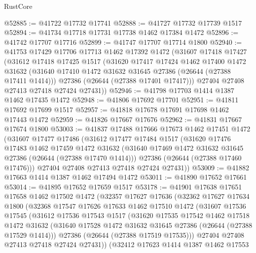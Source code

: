 \begin{lexlean}{RustCore}
\begin{coremodule}
@52885 := @41722 @17732 @17741
@52888 := @41727 @17732 @17739 @1517
@52894 := @41734 @17718 @17731 @17738 @1462 @17384 @1472
@52896 := @41742 @17707 @17716
@52899 := @41747 @17707 @17714 @1800
@52940 := @41753
    @17429
    @17706
    @17713
    @1462
    @17392
    @1472
    (@31607
      @17418
      @17427
      (@31612
        @17418
        @17425
        @1517
        (@31620
          @17417
          @17424
          @1462
          @17400
          @1472
          @31632
          (@31640 @17410 @1472 @31632 @31645 @27386 (@26644 (@27388 @17411 @1414)))
          @27386
          (@26644 (@27388 @17401 @17417)))
        @27404
        @27408
        @27413
        @27418
        @27424
        @27431))
@52946 := @41798 @17703 @1414 @1387 @1462 @17435 @1472
@52948 := @41806 @17692 @17701
@52951 := @41811 @17692 @17699 @1517
@52957 := @41818 @17678 @17691 @17698 @1462 @17443 @1472
@52959 := @41826 @17667 @17676
@52962 := @41831 @17667 @17674 @1800
@53003 := @41837
    @17488
    @17666
    @17673
    @1462
    @17451
    @1472
    (@31607
      @17477
      @17486
      (@31612
        @17477
        @17484
        @1517
        (@31620
          @17476
          @17483
          @1462
          @17459
          @1472
          @31632
          (@31640 @17469 @1472 @31632 @31645 @27386 (@26644 (@27388 @17470 @1414)))
          @27386
          (@26644 (@27388 @17460 @17476)))
        @27404
        @27408
        @27413
        @27418
        @27424
        @27431))
@53009 := @41882 @17663 @1414 @1387 @1462 @17494 @1472
@53011 := @41890 @17652 @17661
@53014 := @41895 @17652 @17659 @1517
@53178 := @41901
    @17638
    @17651
    @17658
    @1462
    @17502
    @1472
    (@32357
      @17627
      @17636
      (@32362
        @17627
        @17634
        @1800
        (@32368
          @17547
          @17626
          @17633
          @1462
          @17510
          @1472
          (@31607
            @17536
            @17545
            (@31612
              @17536
              @17543
              @1517
              (@31620
                @17535
                @17542
                @1462
                @17518
                @1472
                @31632
                (@31640 @17528 @1472 @31632 @31645 @27386 (@26644 (@27388 @17529 @1414)))
                @27386
                (@26644 (@27388 @17519 @17535)))
              @27404
              @27408
              @27413
              @27418
              @27424
              @27431))
          (@32412
            @17623
            @1414
            @1387
            @1462
            @17553

\end{coremodule}
\end{lexlean}
